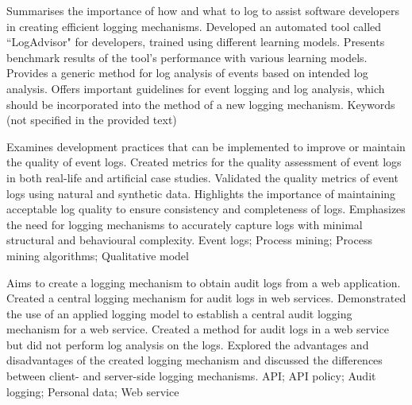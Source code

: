 {
    Summarises the importance of how and what to log to assist software developers in creating efficient logging mechanisms.
}
{
    Developed an automated tool called “LogAdvisor" for developers, trained using different learning models.
}
{
    Presents benchmark results of the tool's performance with various learning models.
}
{
    Provides a generic method for log analysis of events based on intended log analysis. Offers important guidelines for event logging and log analysis, which should be incorporated into the method of a new logging mechanism.
}
{
    Keywords (not specified in the provided text)
}

{
    Examines development practices that can be implemented to improve or maintain the quality of event logs.
}
{
    Created metrics for the quality assessment of event logs in both real-life and artificial case studies.
}
{
    Validated the quality metrics of event logs using natural and synthetic data.
}
{
    Highlights the importance of maintaining acceptable log quality to ensure consistency and completeness of logs. Emphasizes the need for logging mechanisms to accurately capture logs with minimal structural and behavioural complexity.
}
{
    Event logs; Process mining; Process mining algorithms; Qualitative model
}

{
    Aims to create a logging mechanism to obtain audit logs from a web application.
}
{
    Created a central logging mechanism for audit logs in web services.
}
{
    Demonstrated the use of an applied logging model to establish a central audit logging mechanism for a web service.
}
{
    Created a method for audit logs in a web service but did not perform log analysis on the logs. Explored the advantages and disadvantages of the created logging mechanism and discussed the differences between client- and server-side logging mechanisms.
}
{
    API; API policy; Audit logging; Personal data; Web service
}

